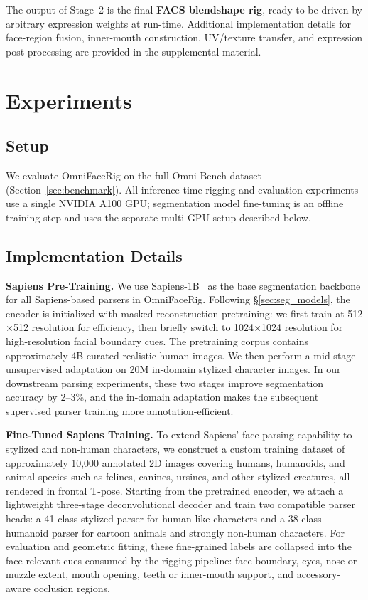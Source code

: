 \documentclass[acmtog,anonymous,review]{acmart}
\begin{document}
The output of Stage~2 is the final \textbf{FACS blendshape rig}, ready to be driven by arbitrary expression weights at run-time. Additional implementation details for face-region fusion, inner-mouth construction, UV/texture transfer, and expression post-processing are provided in the supplemental material.


\section{Experiments}
\label{sec:experiments}

\subsection{Setup}

We evaluate OmniFaceRig on the full Omni-Bench dataset (Section~\ref{sec:benchmark}). All inference-time rigging and evaluation experiments use a single NVIDIA A100 GPU; segmentation model fine-tuning is an offline training step and uses the separate multi-GPU setup described below.


\subsection{Implementation Details}
\label{subsec:implementation}

\textbf{Sapiens Pre-Training.} We use Sapiens-1B~\cite{khirodkar2025sapiens} as the base segmentation backbone for all Sapiens-based parsers in OmniFaceRig. Following \S\ref{sec:seg_models}, the encoder is initialized with masked-reconstruction pretraining: we first train at 512$\times$512 resolution for efficiency, then briefly switch to 1024$\times$1024 resolution for high-resolution facial boundary cues. The pretraining corpus contains approximately 4B curated realistic human images. We then perform a mid-stage unsupervised adaptation on 20M in-domain stylized character images. In our downstream parsing experiments, these two stages improve segmentation accuracy by 2--3\%, and the in-domain adaptation makes the subsequent supervised parser training more annotation-efficient.

\textbf{Fine-Tuned Sapiens Training.} To extend Sapiens' face parsing capability to stylized and non-human characters, we construct a custom training dataset of approximately 10,000 annotated 2D images covering humans, humanoids, and animal species such as felines, canines, ursines, and other stylized creatures, all rendered in frontal T-pose. Starting from the pretrained encoder, we attach a lightweight three-stage deconvolutional decoder and train two compatible parser heads: a 41-class stylized parser for human-like characters and a 38-class humanoid parser for cartoon animals and strongly non-human characters. For evaluation and geometric fitting, these fine-grained labels are collapsed into the face-relevant cues consumed by the rigging pipeline: face boundary, eyes, nose or muzzle extent, mouth opening, teeth or inner-mouth support, and accessory-aware occlusion regions.
\end{document}

